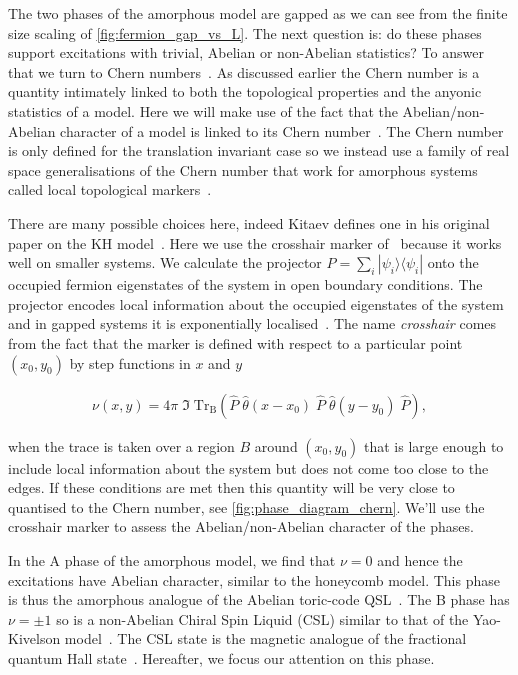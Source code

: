 The two phases of the amorphous model are gapped as we can see from the finite size scaling of \cref{fig:fermion_gap_vs_L}. The next question is: do these phases support excitations with trivial, Abelian or non-Abelian statistics? To answer that we turn to Chern numbers~\autocite{berryQuantalPhaseFactors1984,simonHolonomyQuantumAdiabatic1983,thoulessQuantizedHallConductance1982}. As discussed earlier the Chern number is a quantity intimately linked to both the topological properties and the anyonic statistics of a model. Here we will make use of the fact that the Abelian/non-Abelian character of a model is linked to its Chern number~\autocite{kitaevAnyonsExactlySolved2006}. The Chern number is only defined for the translation invariant case so we instead use a family of real space generalisations of the Chern number that work for amorphous systems called local topological markers~\autocite{bianco_mapping_2011,Hastings_Almost_2010,mitchellAmorphousTopologicalInsulators2018}.

There are many possible choices here, indeed Kitaev defines one in his original paper on the KH model~\autocite{kitaevAnyonsExactlySolved2006}. Here we use the crosshair marker of~\autocite{peru_preprint} because it works well on smaller systems. We calculate the projector \(P = \sum_i |\psi_i\rangle \langle \psi_i|\) onto the occupied fermion eigenstates of the system in open boundary conditions. The projector encodes local information about the occupied eigenstates of the system and in gapped systems it is exponentially localised~\autocite{hastingsLiebSchultzMattisHigherDimensions2004}. The name \emph{crosshair} comes from the fact that the marker is defined with respect to a particular point \((x_0, y_0)\) by step functions in \(x\) and \(y\)

\[\begin{aligned}
    \nu (x, y) = 4\pi \; \Im\; \mathrm{Tr}_{\mathrm{B}} 
    \left ( 
    \hat{P}\;\hat{\theta}(x-x_0)\;\hat{P}\;\hat{\theta}(y-y_0)\; \hat{P}
    \right ),
\end{aligned}\]

when the trace is taken over a region \(B\) around \((x_0, y_0)\) that is large enough to include local information about the system but does not come too close to the edges. If these conditions are met then this quantity will be very close to quantised to the Chern number, see \cref{fig:phase_diagram_chern}. We'll use the crosshair marker to assess the Abelian/non-Abelian character of the phases.

In the A phase of the amorphous model, we find that \(\nu=0\) and hence the excitations have Abelian character, similar to the honeycomb model. This phase is thus the amorphous analogue of the Abelian toric-code QSL~\autocite{kitaev_fault-tolerant_2003}. The B phase has \(\nu=\pm1\) so is a non-Abelian Chiral Spin Liquid (CSL) similar to that of the Yao-Kivelson model~\autocite{yaoExactChiralSpin2007}. The CSL state is the magnetic analogue of the fractional quantum Hall state~\autocite{laughlinPropertiesChiralspinliquidState1990}. Hereafter, we focus our attention on this phase.

